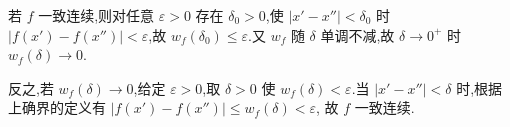 \begin{solution}
    若 $f$ 一致连续,则对任意 $\varepsilon>0$ 存在 $\delta_0>0$,使 $|x'-x''|<\delta_0$ 时 $|f(x')-f(x'')|<\varepsilon$,故 $w_f(\delta_0)\leq\varepsilon$.又 $w_f$ 随 $\delta$ 单调不减,故 $\delta\to0^+$ 时 $w_f(\delta)\to0$.

    反之,若 $w_f(\delta)\to0$,给定 $\varepsilon>0$,取 $\delta>0$ 使 $w_f(\delta)<\varepsilon$.当 $|x'-x''|<\delta$ 时,根据上确界的定义有 $|f(x')-f(x'')|\leq w_f(\delta)<\varepsilon$,
    故 $f$ 一致连续.
\end{solution}
